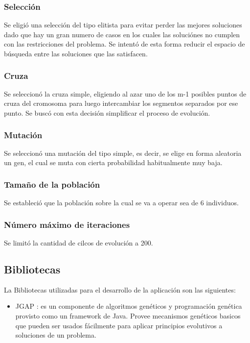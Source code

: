 \documentclass[pdftex,a4paper,10.5pt]{article}
\begin{document}
\subsubsection{Selecci\'on}
Se eligi\'o una selecci\'on del tipo elitista para evitar perder las mejores soluciones dado que hay un gran numero de casos en los cuales las soluci\'ones no cumplen con las restricciones del problema. Se intent\'o de esta forma reducir el espacio de b\'usqueda entre las soluciones que las satisfacen.

\subsubsection{Cruza}
Se seleccion\'o la cruza simple, eligiendo al azar uno de los m-1 posibles puntos de cruza del cromosoma para luego intercambiar los segmentos separados por ese punto. Se busc\'o con esta decisi\'on simplificar el proceso de evoluci\'on.

\subsubsection{Mutaci\'on}
Se seleccion\'o una mutaci\'on del tipo simple, es decir, se elige en forma aleatoria un gen, el cual se muta con cierta probabilidad habitualmente muy baja.

\subsubsection{Tama\~no de la poblaci\'on}
Se estableci\'o que la poblaci\'on sobre la cual se va a operar sea de 6 individuos.
 
\subsubsection{N\'umero m\'aximo de iteraciones}
Se limit\'o la cantidad de cilcos de evoluci\'on a 200.


\subsection{Bibliotecas}
La Bibliotecas utilizadas para el desarrollo de la aplicaci\'on son las
siguientes:
\begin{itemize}

\item JGAP : es un componente de algoritmos gen\'eticos y programaci\'on gen\'etica provisto como un framework de Java. Provee mecanismos gen\'eticos basicos que pueden ser usados f\'acilmente para aplicar principios evolutivos a soluciones de un problema.

\end{itemize}
       
\end{document}
